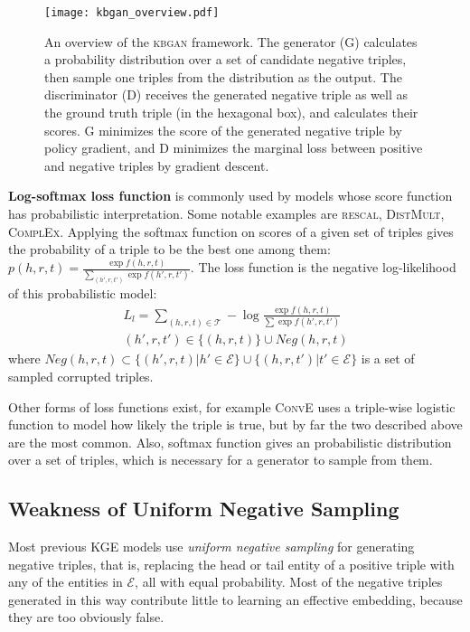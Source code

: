 \documentclass[11pt,a4paper]{article}
\begin{document}
\begin{figure*}[t]
  \centering
    \texttt{[image: kbgan\_overview.pdf]}
  \caption{An overview of the \textsc{kbgan} framework. The generator (G) calculates a probability distribution over a set of candidate negative triples, then sample one triples from the distribution as the output. The discriminator (D) receives the generated negative triple as well as the ground truth triple (in the hexagonal box), and calculates their scores. G minimizes the score of the generated negative triple by policy gradient, and D minimizes the marginal loss between positive and negative triples by gradient descent.}
  \label{fig:overview}
\end{figure*}

\noindent \textbf{Log-softmax loss function} is commonly used by models whose score function has probabilistic interpretation. Some notable examples are \textsc{rescal}, \textsc{DistMult}, \textsc{ComplEx}. Applying the softmax function on scores of a given set of triples gives the probability of a triple to be the best one among them: $p(h,r,t)=\frac{\exp f(h,r,t)}{\sum_{(h',r,t')}\exp f(h',r,t')}$. The loss function is the negative log-likelihood of this probabilistic model:
\begin{multline}
L_{l}=\sum_{(h,r,t)\in\mathcal{T}}-\log \frac{\exp f(h,r,t)}{\sum\exp f(h',r,t')}\\
(h',r,t')\in\{(h,r,t)\}\cup Neg(h,r,t)\label{eq:nllloss}
\end{multline}
where $Neg(h,r,t)\subset\{(h',r,t)|h'\in\mathcal{E}\}\cup\{(h,r,t')|t'\in\mathcal{E}\}$ is a set of sampled corrupted triples.

Other forms of loss functions exist, for example \textsc{ConvE} uses a triple-wise logistic function to model how likely the triple is true, but by far the two described above are the most common. Also, softmax function gives an probabilistic distribution over a set of triples, which is necessary for a generator to sample from them.

\subsection{Weakness of Uniform Negative Sampling}

Most previous KGE models use \emph{uniform negative sampling} for generating negative triples, that is, replacing the head or tail entity of a positive triple with any of the entities in $\mathcal{E}$, all with equal probability. Most of the negative triples generated in this way contribute little to learning an effective embedding, because they are too obviously false.
\end{document}
